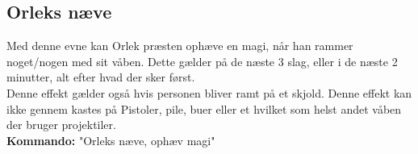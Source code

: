 \subsection{Orleks næve}
Med denne evne kan Orlek præsten ophæve en magi, når han rammer noget/nogen med sit våben. Dette gælder på de næste 3 slag, eller i de næste 2 minutter, alt efter hvad der sker først.\\
Denne effekt gælder også hvis personen bliver ramt på et skjold. Denne effekt kan ikke gennem kastes på Pistoler, pile, buer eller et hvilket som helst andet våben der bruger projektiler.\\
\textbf{Kommando:} "Orleks næve, ophæv magi"\\
